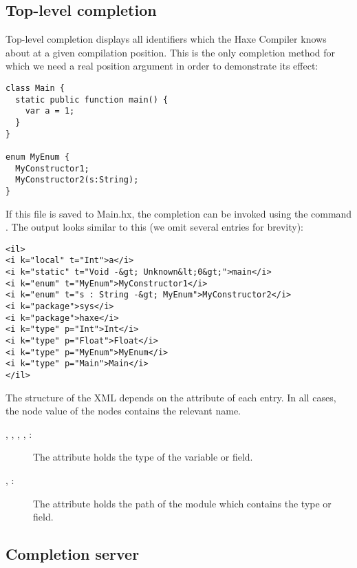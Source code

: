 \subsection{Top-level completion}
\label{cr-completion-top-level}

Top-level completion displays all identifiers which the Haxe Compiler knows about at a given compilation position. This is the only completion method for which we need a real position argument in order to demonstrate its effect:

\begin{lstlisting}
class Main {
  static public function main() {
    var a = 1;
  }
}

enum MyEnum {
  MyConstructor1;
  MyConstructor2(s:String);
}
\end{lstlisting}

If this file is saved to Main.hx, the completion can be invoked using the command . The output looks similar to this (we omit several entries for brevity):

\begin{lstlisting}
<il>
<i k="local" t="Int">a</i>
<i k="static" t="Void -&gt; Unknown&lt;0&gt;">main</i>
<i k="enum" t="MyEnum">MyConstructor1</i>
<i k="enum" t="s : String -&gt; MyEnum">MyConstructor2</i>
<i k="package">sys</i>
<i k="package">haxe</i>
<i k="type" p="Int">Int</i>
<i k="type" p="Float">Float</i>
<i k="type" p="MyEnum">MyEnum</i>
<i k="type" p="Main">Main</i>
</il>
\end{lstlisting}

The structure of the XML depends on the  attribute of each entry. In all cases, the node value of the  nodes contains the relevant name.

\begin{description}
	\item[, , , , :] The  attribute holds the type of the variable or field.
	\item[, :] The  attribute holds the path of the module which contains the type or field.
\end{description}



\subsection{Completion server}
\label{cr-completion-server}

